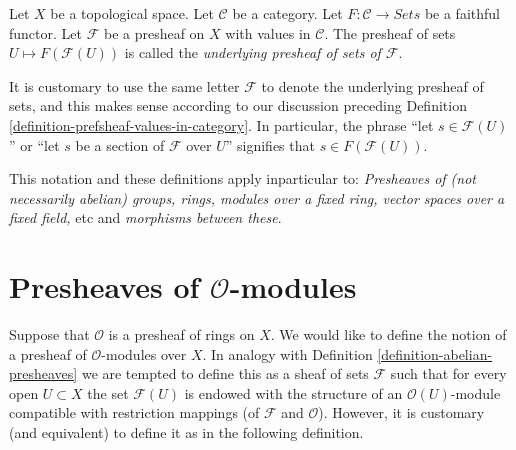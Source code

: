 \begin{definition}
\label{definition-underlying-presheaf-sets}
Let $X$ be a topological space. Let $\mathcal{C}$ be a category.
Let $F : \mathcal{C} \to \textit{Sets}$ be a faithful functor.
Let $\mathcal{F}$ be a presheaf on $X$ with values in $\mathcal{C}$.
The presheaf of sets $U \mapsto F(\mathcal{F}(U))$
is called the {\it underlying presheaf of sets of $\mathcal{F}$}.
\end{definition}

\noindent
It is customary to use the same letter $\mathcal{F}$ to denote
the underlying presheaf of sets, and this makes
sense according to our discussion preceding
Definition \ref{definition-prefsheaf-values-in-category}.
In particular, the phrase ``let $s \in \mathcal{F}(U)$''
or ``let $s$ be a section of $\mathcal{F}$ over $U$'' signifies
that $s \in F(\mathcal{F}(U))$.

\medskip\noindent
This notation and these definitions apply inparticular to:
{\it Presheaves of (not necessarily abelian) groups, rings, modules
over a fixed ring, vector spaces over a fixed field, } etc and
{\it morphisms between these}.

\section{Presheaves of $\mathcal{O}$-modules}
\label{section-presheaves-modules}

\noindent
Suppose that $\mathcal{O}$ is a presheaf of rings on $X$.
We would like to define the notion of a presheaf of
$\mathcal{O}$-modules over $X$. In analogy with Definition
\ref{definition-abelian-presheaves} we are tempted to define
this as a sheaf of sets $\mathcal{F}$ such that for every open
$U \subset X$ the set $\mathcal{F}(U)$ is endowed with the structure
of an $\mathcal{O}(U)$-module compatible with restriction mappings
(of $\mathcal{F}$ and $\mathcal{O}$). However, it is customary
(and equivalent) to define it as in the following definition.

